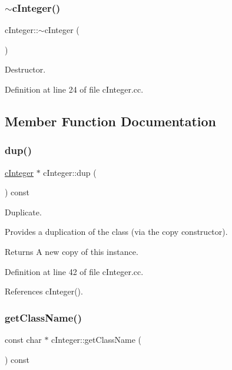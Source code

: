 \subsubsection{\texorpdfstring{$\sim$c\+Integer()}{~cInteger()}}
{\footnotesize\ttfamily c\+Integer\+::$\sim$c\+Integer (\begin{DoxyParamCaption}{ }\end{DoxyParamCaption})\hspace{0.3cm}{\ttfamily [virtual]}}



Destructor. 



Definition at line 24 of file c\+Integer.\+cc.



\subsection{Member Function Documentation}
\mbox{\label{classcInteger_a5fb5092056503a1241fbde5d80ef21ff}} 
\subsubsection{\texorpdfstring{dup()}{dup()}}
{\footnotesize\ttfamily \hyperlink{classcInteger}{c\+Integer} $\ast$ c\+Integer\+::dup (\begin{DoxyParamCaption}{ }\end{DoxyParamCaption}) const}



Duplicate. 

Provides a duplication of the class (via the copy constructor). \begin{DoxyReturn}{Returns}
A new copy of this instance. 
\end{DoxyReturn}


Definition at line 42 of file c\+Integer.\+cc.



References c\+Integer().

\mbox{\label{classcInteger_afd31eb924e2bfcc90f4a436acd4a827d}} 
\subsubsection{\texorpdfstring{get\+Class\+Name()}{getClassName()}}
{\footnotesize\ttfamily const char $\ast$ c\+Integer\+::get\+Class\+Name (\begin{DoxyParamCaption}{ }\end{DoxyParamCaption}) const}

